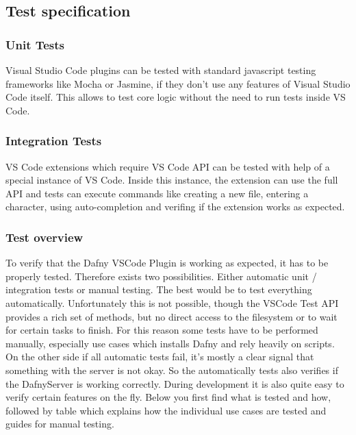 \subsection{Test specification}

\subsubsection{Unit Tests}
Visual Studio Code plugins can be tested with standard javascript testing frameworks like Mocha or Jasmine, if they don't use any features of Visual Studio Code itself. This allows to test core logic without the need to run tests inside VS Code.

\subsubsection{Integration Tests}
VS Code extensions which require VS Code API can be tested with help of a special instance of VS Code. Inside this instance, the extension can use the full API and tests can execute commands like creating a new file, entering a character, using auto-completion and verifing if the extension works as expected.   

\subsubsection{Test overview}
To verify that the Dafny VSCode Plugin is working as expected, it has to be properly tested. Therefore exists two possibilities. Either automatic unit / integration tests or manual testing. The best would be to test everything automatically. Unfortunately this is not possible, though the VSCode Test API provides a rich set of methods, but no direct access to the filesystem or to wait for certain tasks to finish. For this reason some tests have to be performed manually, especially use cases which installs Dafny and rely heavily on scripts. On the other side if all automatic tests fail, it's mostly a clear signal that something with the server is not okay. So the automatically tests also verifies if the DafnyServer is working correctly. During development it is also quite easy to verify certain features on the fly. 
Below you first find what is tested and how, followed by table which explains how the individual use cases are tested and guides for manual testing. 

